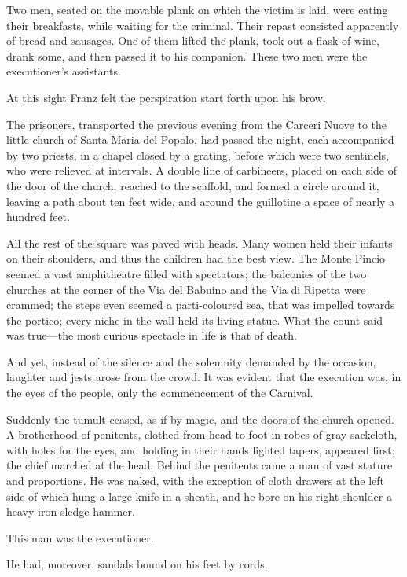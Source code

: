  Two men, seated on the movable plank on which the victim is laid, were eating their breakfasts, while waiting for the criminal. Their repast consisted apparently of bread and sausages. One of them lifted the plank, took out a flask of wine, drank some, and then passed it to his companion. These two men were the executioner's assistants. 

 At this sight Franz felt the perspiration start forth upon his brow. 

 The prisoners, transported the previous evening from the Carceri Nuove to the little church of Santa Maria del Popolo, had passed the night, each accompanied by two priests, in a chapel closed by a grating, before which were two sentinels, who were relieved at intervals. A double line of carbineers, placed on each side of the door of the church, reached to the scaffold, and formed a circle around it, leaving a path about ten feet wide, and around the guillotine a space of nearly a hundred feet. 

 All the rest of the square was paved with heads. Many women held their infants on their shoulders, and thus the children had the best view. The Monte Pincio seemed a vast amphitheatre filled with spectators; the balconies of the two churches at the corner of the Via del Babuino and the Via di Ripetta were crammed; the steps even seemed a parti-coloured sea, that was impelled towards the portico; every niche in the wall held its living statue. What the count said was true—the most curious spectacle in life is that of death. 

 And yet, instead of the silence and the solemnity demanded by the occasion, laughter and jests arose from the crowd. It was evident that the execution was, in the eyes of the people, only the commencement of the Carnival. 

 Suddenly the tumult ceased, as if by magic, and the doors of the church opened. A brotherhood of penitents, clothed from head to foot in robes of gray sackcloth, with holes for the eyes, and holding in their hands lighted tapers, appeared first; the chief marched at the head.  Behind the penitents came a man of vast stature and proportions. He was naked, with the exception of cloth drawers at the left side of which hung a large knife in a sheath, and he bore on his right shoulder a heavy iron sledge-hammer. 

 This man was the executioner. 

 He had, moreover, sandals bound on his feet by cords. 

